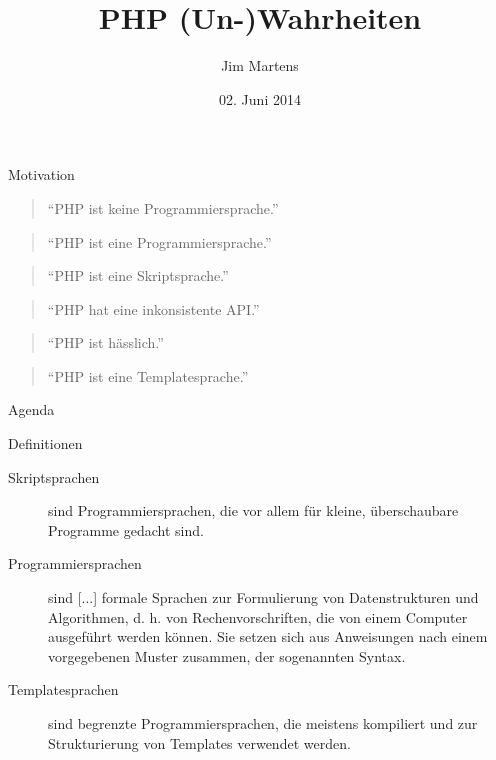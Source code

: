 \documentclass{beamer}
\begin{document}
\author{Jim Martens}
\title{PHP (Un-)Wahrheiten}
\date{02. Juni 2014}

	\begin{frame}
		\titlepage
	\end{frame}
	
	\begin{frame}{Motivation}
		\begin{quotation}
			"`PHP ist keine Programmiersprache."'
		\end{quotation}
			
		\begin{quotation}
			"`PHP ist eine Programmiersprache."'
		\end{quotation}
		
		\begin{quotation}
			"`PHP ist eine Skriptsprache."'
		\end{quotation}
		
		\begin{quotation}
			"`PHP hat eine inkonsistente API."'
		\end{quotation}
		
		\begin{quotation}
			"`PHP ist hässlich."'
		\end{quotation}
		
		\begin{quotation}
			"`PHP ist eine Templatesprache."'
		\end{quotation}
	\end{frame}
	
	\begin{frame}{Agenda}
		\tableofcontents
	\end{frame}
	
	\begin{frame}{Definitionen}
		\begin{description}
			\item[Skriptsprachen] sind Programmiersprachen, die vor allem für kleine, überschaubare Programme gedacht sind.
			\item[Programmiersprachen] sind [...] formale Sprachen zur Formulierung von Datenstrukturen und Algorithmen, d. h. von Rechenvorschriften, die von einem Computer ausgeführt werden können. Sie setzen sich aus Anweisungen nach einem vorgegebenen Muster zusammen, der sogenannten Syntax.
			\item[Templatesprachen] sind begrenzte Programmiersprachen, die meistens kompiliert und zur Strukturierung von Templates verwendet werden.
		\end{description}
	\end{frame}
	
\end{document}
